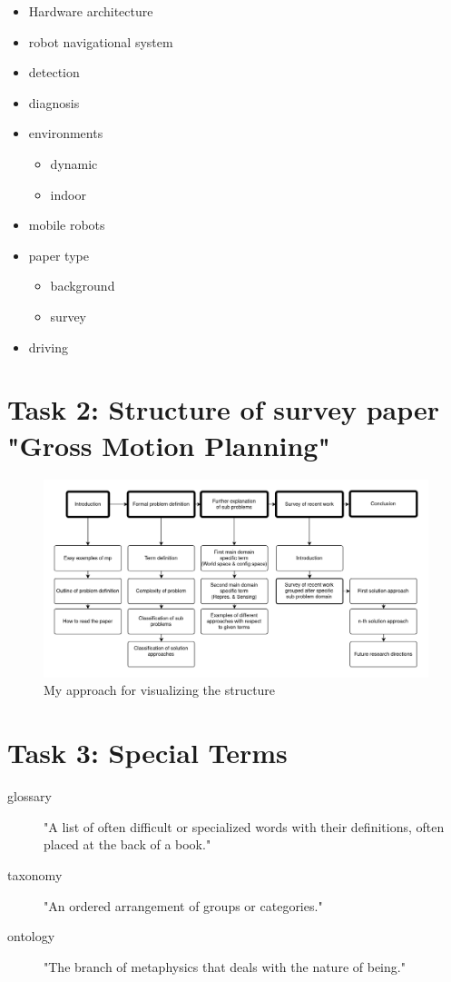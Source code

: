 \documentclass{article}
\begin{document}
\begin{itemize}
      \item Hardware architecture
      \item robot navigational system
      \item detection
      \item diagnosis
      \item environments
      \begin{itemize}
          \item dynamic
          \item indoor
      \end{itemize}
      \item mobile robots
      \item paper type
      \begin{itemize}
          \item background
          \item survey
      \end{itemize}
      \item driving
  \end{itemize}

\section*{Task 2: Structure of survey paper "Gross Motion Planning"\cite{GMP}}
\begin{figure}[h!]
    \includegraphics[width=\linewidth]{gmp_flowchart.png}
    \caption{My approach for visualizing the structure}
    \label{fig:nuns}
  \end{figure}


  \section*{Task 3: Special Terms}

  \begin{description}
      \item[glossary] "A list of often difficult or specialized words with their definitions, often placed at the back of a book."\cite{wn_glos:1}
      \item[taxonomy] "An ordered arrangement of groups or categories."\cite{wn_tax:1}
      \item[ontology] "The branch of metaphysics that deals with the nature of being."\cite{wn_onto:1}
  \end{description}
  
\end{document}
